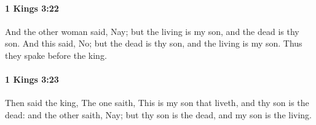 		\paragraph{1 Kings 3:22} %
			\label{1KINGS-3-22}

			And the other woman said, Nay; but the living is my son, and the dead is thy son. And this said, No; but the dead is thy son, and the living is my son. Thus they spake before the king.


		\paragraph{1 Kings 3:23} %
			\label{1KINGS-3-23}

			Then said the king, The one saith, This is my son that liveth, and thy son is the dead: and the other saith, Nay; but thy son is the dead, and my son is the living.


